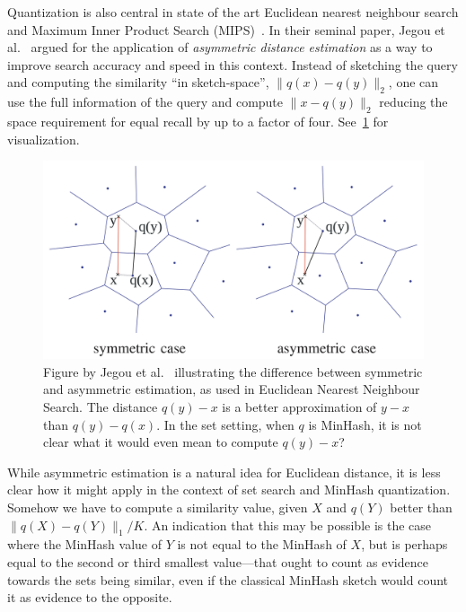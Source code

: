 Quantization is also central in state of the art Euclidean nearest neighbour search and Maximum Inner Product Search (MIPS)~\cite{guo2020accelerating}.
In their seminal paper, Jegou et al.~\cite{jegou2010product}
argued for the application of \emph{asymmetric distance estimation} as a way to improve search accuracy and speed in this context.
Instead of sketching the query and computing the similarity ``in sketch-space'', $\|q(x)-q(y)\|_2$,
one can use the full information of the query and compute $\|x-q(y)\|_2$ reducing the space requirement for equal recall by up to a factor of four.
See~\cref{fig:jegou} for visualization.

\begin{figure}
   \centering
   \includegraphics[width=\linewidth]{figures/pq}
\caption{Figure by Jegou et al.~\cite{jegou2010product} illustrating the difference between symmetric and asymmetric estimation, as used in Euclidean Nearest Neighbour Search.
   The distance $q(y)-x$ is a better approximation of $y-x$ than $q(y)-q(x)$.
   In the set setting, when $q$ is MinHash, it is not clear what it would even mean to compute $q(y)-x$?
}
   \label{fig:jegou}
\end{figure}


While asymmetric estimation is a natural idea for Euclidean distance, it is less clear how it might apply in the context of set search and MinHash quantization.
Somehow we have to compute a similarity value, given $X$ and $q(Y)$ better than $\|q(X)-q(Y)\|_1/K$.
An indication that this may be possible is the case where the MinHash value of $Y$ is not equal to the MinHash of $X$, but is perhaps equal to the second or third smallest value---that ought to count as evidence towards the sets being similar, even if the classical MinHash sketch would count it as evidence to the opposite.

